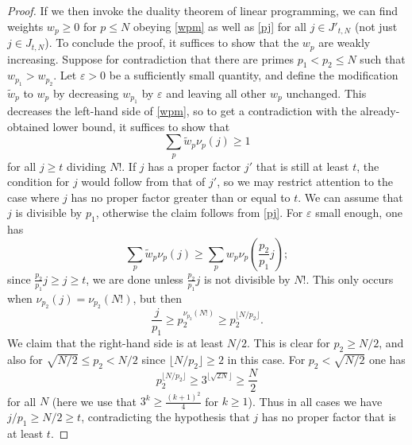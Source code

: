 \documentclass[12pt,a4paper,reqno]{amsart}
\numberwithin{equation}{section}
\theoremstyle{plain}
\theoremstyle{definition}
\newcommand\eps{\varepsilon}
\begin{document}
\begin{proof}
If we then invoke the duality theorem of linear programming, we can find weights $w_p \geq 0$ for $p \leq N$ obeying \eqref{wpm} as well as \eqref{pj} for all $j \in J'_{t,N}$ (not just $j \in J_{t,N}$).  To conclude the proof, it suffices to show that the $w_p$ are weakly increasing. Suppose for contradiction that there are primes $p_1 < p_2 \leq N$ such that $w_{p_1} > w_{p_2}$.  Let $\eps>0$ be a sufficiently small quantity, and define the modification $\tilde w_p$ to $w_p$ by decreasing $w_{p_1}$ by $\eps$ and leaving all other $w_p$ unchanged.  This decreases the left-hand side of \eqref{wpm}, so to get a contradiction with the already-obtained lower bound, it suffices to show that
  $$ \sum_p \tilde w_p \nu_p(j) \geq 1$$
  for all $j \geq t$ dividing $N!$.  If $j$ has a proper factor $j'$ that is still at least $t$, the condition for $j$ would follow from that of $j'$, so we may restrict attention to the case where $j$ has no proper factor greater than or equal to $t$.  We can assume that $j$ is divisible by $p_1$, otherwise the claim follows from \eqref{pj}.  For $\eps$ small enough, one has
  $$ \sum_p \tilde w_p \nu_p(j) \geq \sum_p w_p \nu_p\left(\frac{p_2}{p_1} j\right);$$
since $\frac{p_2}{p_1} j \geq j \geq t$, we are done unless $\frac{p_2}{p_1} j$ is not divisible by $N!$. This only occurs when $\nu_{p_2}(j) = \nu_{p_2}(N!)$, but then
$$ \frac{j}{p_1} \geq p_2^{\nu_{p_2}(N!)} \geq p_2^{\lfloor N/p_2\rfloor}.$$
We claim that the right-hand side is at least $N/2$.  This is clear for $p_2 \geq N/2$, and also for $\sqrt{N/2} \leq p_2 < N/2$ since $\lfloor N/p_2\rfloor \geq 2$ in this case.  For $p_2 < \sqrt{N/2}$ one has 
$$  p_2^{\lfloor N/p_2\rfloor} \geq 3^{\lfloor \sqrt{2N} \rfloor} \geq \frac{N}{2}$$
for all $N$ (here we use that $3^k \geq \frac{(k+1)^2}{4}$ for $k \geq 1$).  Thus in all cases we have $j/p_1 \geq N/2 \geq t$, contradicting the hypothesis that $j$ has no proper factor that is at least $t$.
\end{proof}
\end{document}
